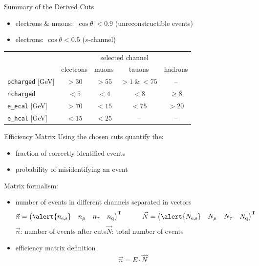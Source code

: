 \documentclass[11pt,xcolor=dvipsnames,professionalfonts]{beamer}
\begin{document}
\begin{frame}{Summary of the Derived Cuts}
	\begin{itemize}
		\item electrons \& muons: \quad $\left| \cos\theta \right| < 0.9$ (unreconstructible events)
		\item electrons: \quad $\cos\theta < 0.5$ ($s$-channel)
	\end{itemize}
	\vfill
	\begin{center}
		\begin{tabular}{lcccc}
			\toprule
			&\multicolumn{4}{c}{selected channel}  \\ \cmidrule(r){2-5}
			& electrons & muons & tauons & hadrons \\
			\midrule
			\texttt{pcharged} [GeV] & $> 30$ & $> 55$ & $>1\:\&\:<75$ & --\\
			\texttt{ncharged} & $< 5$  & $< 4$  & $< 8$ & $\geq 8$ \\
			\texttt{e\_ecal} [GeV] & $> 70$ & $< 15$ & $< 75$ & $> 20$ \\
			\texttt{e\_hcal} [GeV] & $< 15$ & $< 25$ & -- & -- \\
			\bottomrule
		\end{tabular}
	\end{center}
\end{frame}

\begin{frame}{Efficiency Matrix}
	Using the chosen cuts quantify the:
	\begin{itemize}
		\setlength\itemsep{1.em}
		\item fraction of correctly identified events
		\item probability of misidentifying an event
	\end{itemize}
	\vspace{0.7cm}
	\pause
	Matrix formalism:
	\begin{itemize}
		\setlength\itemsep{1.em}
		\item number of events in different channels separated in vectors
		\begin{align*}
			&\vec{n} = \begin{pmatrix}
			\alert{n_\mathrm{e,s}} & n_\mathrm{\mu} & n_\mathrm{\tau} & n_\mathrm{q}
			\end{pmatrix}^\mathrm{T}
			\qquad
			&\vec{N} = \begin{pmatrix}
			\alert{N_\mathrm{e,s}} & N_\mathrm{\mu} & N_\mathrm{\tau} & N_\mathrm{q}
			\end{pmatrix}^\mathrm{T}
		\end{align*}
		$\vec{n}$: number of events after cuts\qquad $\vec{N}$: total number of events 
		
		\item efficiency matrix definition
		\begin{align*}
			\vec{n} = E \cdot \vec{N}
		\end{align*}
		
		
	\end{itemize}
\end{frame}
\end{document}
